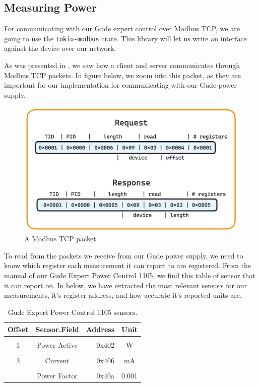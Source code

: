 \documentclass[
  table]{report}
\begin{document}
\subsection{Measuring Power}

For communicating with our Gude expert control over Modbus TCP, we are
going to use the \texttt{tokio-modbus} crate. This library will let us
write an interface against the device over our network.

As was presented in , we saw how a client
and server communicates through Modbus TCP packets. In figure
 below, we zoom into this packet, as they
are important for our implementation for communicating with our Gude
power supply.

\begin{figure}[H]
\centering
  \includegraphics[width=0.7\columnwidth]{assets/6-modbus_packet.png}
  \caption{A Modbus TCP packet.}
  \label{fig:modbus_tcp_packet}
\end{figure}

To read from the packets we receive from our Gude power supply, we need
to know which register each measurement it can report to are registered.
From the manual of our Gude Expert Power Control 1105, we find this
table of sensor that it can report on. In  below,
we have extracted the most relevant sensors for our measurements, it's
register address, and how accurate it's reported units are.

\begin{table}[H]
\centering
\caption{\label{tab:unnamed-chunk-1}Gude Expert Power Control 1105 sensors. \label{tab:gude_config}}
\centering
\begin{tabular}[t]{ccrc}
\toprule
Offset & Sensor.Field & Address & Unit\\
\midrule
\cellcolor{gray!10}{0} & \cellcolor{gray!10}{Absolute Active Energy} & \cellcolor{gray!10}{0x400} & \cellcolor{gray!10}{Wh}\\
1 & Power Active & 0x402 & W\\
\cellcolor{gray!10}{2} & \cellcolor{gray!10}{Voltage} & \cellcolor{gray!10}{0x404} & \cellcolor{gray!10}{V}\\
3 & Current & 0x406 & mA\\
\cellcolor{gray!10}{4} & \cellcolor{gray!10}{Frequency} & \cellcolor{gray!10}{0x408} & \cellcolor{gray!10}{0.01hz}\\
\addlinespace
5 & Power Factor & 0x40a & 0.001\\
\bottomrule
\end{tabular}
\end{table}
\end{document}
